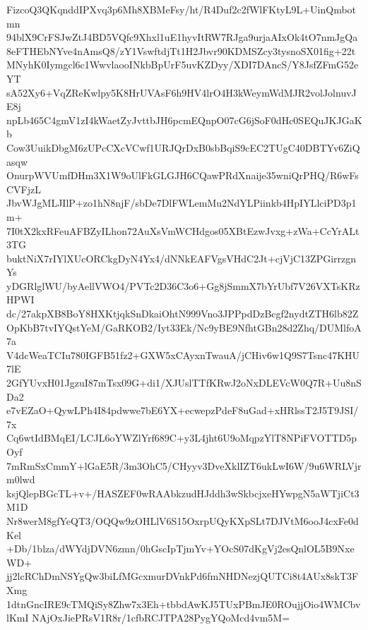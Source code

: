 FizcoQ3QKqnddIPXvq3p6Mh8XBMeFsy/ht/R4Duf2c2fWlFKtyL9L+UinQmbotmn
94blX9CrFSJwZtJ4BD5VQfc9Xhxl1uE1hyvItRW7RJga9urjaAIxOk4tO7nmJgQa
8eFTHEbNYve4nAmsQ8/zY1VswftdjTt1H2Jbvr90KDMSZcy3tysnoSX01fig+22t
MNyhK0Iymgcl6c1WwvlaooINkbBpUrF5uvKZDyy/XDI7DAncS/Y8JsfZFmG52eYT
sA52Xy6+VqZReKwlpy5K8HrUVAsF6h9HV4lrO4H3kWeymWdMJR2volJolnuvJE8j
npLb465C4gmV1zI4kWaetZyJvttbJH6pcmEQnpO07cG6jSoF0dHc0SEQuJKJGaKb
Cow3UuikDbgM6zUPcCXcVCwf1URJQrDxB0sbBqiS9cEC2TUgC40DBTYv6ZiQasqw
OnurpWVUmfDHm3X1W9oUlFkGLGJH6CQawPRdXnaije35wniQrPHQ/R6wFsCVFjzL
JbvWJgMLJIlP+zo1hN8njF/sbDe7DlFWLemMu2NdYLPiinkb4HpIYLlciPD3p1m+
7I0tX2kxRFeuAFBZyILhon72AuXsVmWCHdgos05XBtEzwJvxg+zWa+CcYrALt3TG
buktNiX7rIYlXUcORCkgDyN4Yx4/dNNkEAFVgsVHdC2Jt+cjVjC13ZPGirrzgnYs
yDGRlglWU/byAellVWO4/PVTc2D36C3o6+Gg8jSmmX7bYrUbf7V26VXTsKRzHPWI
dc/27akpXB8BoY8HXKtjqkSnDkaiOhtN999Vno3JPPpdDzBcgf2nydtZTH6lb82Z
OpKbB7tvIYQstYeM/GaRKOB2/Iyt33Ek/Nc9yBE9NfhtGBn28d2Zhq/DUMlfoA7a
V4dcWeaTCIu780IGFB51fz2+GXW5xCAyxnTwauA/jCHiv6w1Q9S7Tsnc47KHU7lE
2GfYUvxH01JgzuI87mTsx09G+di1/XJUslTTfKRwJ2oNxDLEVcW0Q7R+Uu8nSDa2
e7vEZaO+QywLPh4I84pdwwe7bE6YX+ecwepzPdeF8uGad+xHRlssT2J5T9JSI/7x
Cq6wtIdBMqEI/LCJL6oYWZlYrf689C+y3L4jht6U9oMqpzYlT8NPiFVOTTD5pOyf
7mRmSxCmmY+lGaE5R/3m3OhC5/CHyyv3DveXklIZT6ukLwI6W/9u6WRLVjrm0lwd
ksjQlepBGcTL+v+/HASZEF0wRAAbkzudHJddh3wSkbcjxeHYwpgN5aWTjiCt3M1D
Nr8werM8gfYeQT3/OQQw9zOHLlV6S15OxrpUQyKXpSLt7DJVtM6ooJ4cxFe0dKel
+Db/1blza/dWYdjDVN6zmn/0hGscIpTjmYv+YOcS07dKgVj2esQnlOL5B9NxeWD+
jj2lcRChDmNSYgQw3biLfMGcxmurDVnkPd6fmNHDNezjQUTCi8t4AUx8skT3FXmg
1dtnGncIRE9cTMQiSy8Zhw7x3Eh+tbbdAwKJ5TUxPBmJE0ROujjOio4WMCbvlKmI
NAjOxJiePRsV1R8r/1cfbRCJTPA28PygYQoMcd4vm5M=
